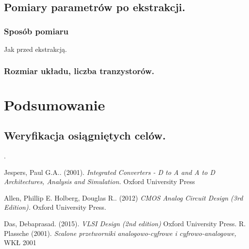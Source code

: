 \documentclass[10pt,a4paper]{report}
\begin{document}
	\section{Pomiary parametrów po ekstrakcji.}
	\subsection{Sposób pomiaru}
	Jak przed ekstrakcją.
	\subsection{Rozmiar układu, liczba tranzystorów.}

	\chapter{Podsumowanie}
	\section{Weryfikacja osiągniętych celów.}
	
	
	\appendix
.
	\begin{thebibliography}{9}
		Jespers, Paul G.A.. (2001). 
		\textit{Integrated Converters - D to A and A to D Architectures, Analysis and Simulation.}
		Oxford University Press
		
		Allen, Phillip E. Holberg, Douglas R.. (2012)  
		\textit{CMOS Analog Circuit Design (3rd Edition). }
		Oxford University Press.
		
		Das, Debaprasad. (2015).
		\textit{VLSI Design (2nd edition)}
		Oxford University Press.
		R. Plassche (2001). 
		\textit{Scalone przetworniki analogowo-cyfrowe i cyfrowo-analogowe,}
		WKŁ 2001
	\end{thebibliography}
\end{document}
